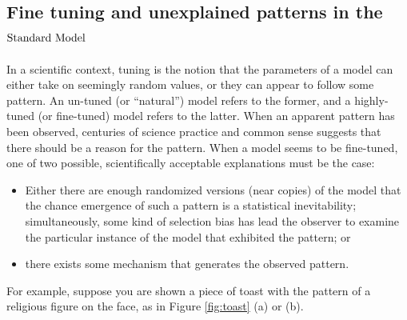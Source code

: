 \subsection{Fine tuning and unexplained patterns in the $\text{Standard\ Model}$}
\label{sec:finetune}
In a scientific context, tuning is the notion that the parameters of a model can either take on seemingly random values, or they can appear to follow some pattern. An un-tuned (or ``natural'') model refers to the former, and a highly-tuned (or fine-tuned) model refers to the latter. When an apparent pattern has been observed, centuries of science practice and common sense suggests that there should be a reason for the pattern. When a model seems to be fine-tuned, one of two possible, scientifically acceptable explanations must be the case:  
\begin{itemize}
\item{Either there are enough randomized versions (near copies) of the model that the chance emergence of such a pattern is a statistical inevitability; simultaneously, some kind of selection bias has lead the observer to examine the particular instance of the model that exhibited the pattern; or}
\item{there exists some mechanism that generates the observed pattern. }
\end{itemize}
For example, suppose you are shown a piece of toast with the pattern of a religious figure on the face, as in Figure \ref{fig:toast} (a) or (b). 
